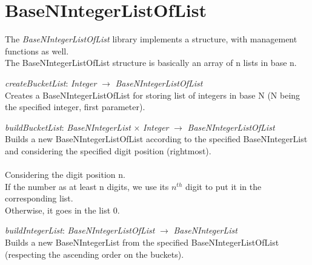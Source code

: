 \documentclass[book, backcover, english, nodocumentinfo]{upmethodology-document}
\begin{document}
	\section{BaseNIntegerListOfList}
		The \textit{BaseNIntegerListOfList} library implements a structure, with management functions as well.\\
		The BaseNIntegerListOfList structure is basically an array of n lists in base n.\\

		\begin{minipage}{\linewidth}
			\textit{createBucketList}: \textit{Integer} $\rightarrow$ \textit{BaseNIntegerListOfList}\\
			Creates a BaseNIntegerListOfList for storing list of integers in base N (N being the specified integer, first parameter).
			\label{algo:BNIL-CreateBucketList}
			
		\end{minipage}
		\nxtalgo{}

		\begin{minipage}{\linewidth}
			\textit{buildBucketList}: \textit{BaseNIntegerList} $\times$ \textit{Integer} $\rightarrow$ \textit{BaseNIntegerListOfList}\\
			Builds a new BaseNIntegerListOfList according to the specified BaseNIntegerList and considering the specified digit position (rightmost).\\
			\ov\\
			Considering the digit position n.\\
			If the number as at least n digits, we use its $n^{th}$ digit to put it in the corresponding list.\\
			Otherwise, it goes in the list 0.\\
			\label{algo:BNIL-BuildBucketList}
			
		\end{minipage}
		\nxtalgo{}

		\begin{minipage}{\linewidth}
			\textit{buildIntegerList}: \textit{BaseNIntegerListOfList} $\rightarrow$ \textit{BaseNIntegerList}\\
			Builds a new BaseNIntegerList from the specified BaseNIntegerListOfList (respecting the ascending order on the buckets).\\
			\label{algo:BNIL-BuildIntegerList}
			
		\end{minipage}
		\nxtalgo{}
\end{document}
